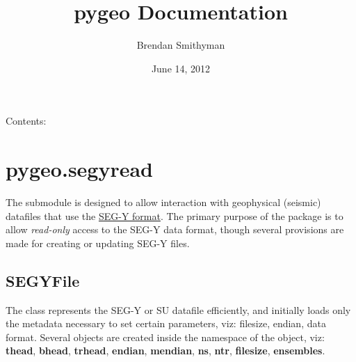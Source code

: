 \documentclass[letterpaper,10pt,english]{sphinxmanual}
\title{pygeo Documentation}
\date{June 14, 2012}
\author{Brendan Smithyman}
\begin{document}
\maketitle
\tableofcontents
{}\label{index::doc}


Contents:


\chapter{pygeo.segyread}
\label{segyread:welcome-to-pygeo-s-documentation}\label{segyread:pygeo-segyread}\label{segyread::doc}
The {\hyperref[segyread:module-pygeo.segyread]{}} submodule is designed to allow interaction with geophysical (seismic) datafiles that use the \href{http://en.wikipedia.org/wiki/SEG-Y}{SEG-Y format}.  The primary purpose of the package is to allow \emph{read-only} access to the SEG-Y data format, though several provisions are made for creating or updating SEG-Y files.
\label{segyread:module-pygeo.segyread}\label{segyread:module-pygeo.segyread}

\section{SEGYFile}
\label{segyread:segyfile}
The  {\hyperref[segyread:pygeo.segyread.SEGYFile]{}} class represents the SEG-Y or SU datafile efficiently, and initially loads only the metadata necessary to set certain parameters, viz: filesize, endian, data format.  Several objects are created inside the namespace of the {\hyperref[segyread:pygeo.segyread.SEGYFile]{}} object, viz: \textbf{thead}, \textbf{bhead}, \textbf{trhead}, \textbf{endian}, \textbf{mendian}, \textbf{ns}, \textbf{ntr}, \textbf{filesize}, \textbf{ensembles}.
\end{document}
